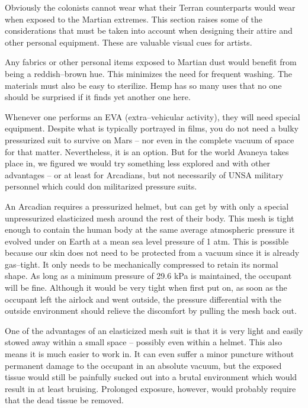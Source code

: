 

Obviously the colonists cannot wear what their Terran counterparts would wear when exposed to the Martian extremes. This section raises some of the considerations that must be taken into account when designing their attire and other personal equipment. These are valuable visual cues for artists.

Any fabrics or other personal items exposed to Martian dust would benefit from being a reddish--brown hue. This minimizes the need for frequent washing. The materials must also be easy to sterilize. Hemp has so many uses that no one should be surprised if it finds yet another one here.

Whenever one performs an EVA (extra--vehicular activity), they will need special equipment. Despite what is typically portrayed in films, you do not need a bulky pressurized suit to survive on Mars -- nor even in the complete vacuum of space for that matter. Nevertheless, it is an option. But for the world Avaneya takes place in, we figured we would try something less explored and with other advantages -- or at least for Arcadians, but not necessarily of UNSA military personnel which could don militarized pressure suits.

An Arcadian requires a pressurized helmet, but can get by with only a special unpressurized elasticized mesh around the rest of their body. This mesh is tight enough to contain the human body at the same average atmospheric pressure it evolved under on Earth at a mean sea level pressure of 1 atm. This is possible because our skin does not need to be protected from a vacuum since it is already gas--tight. It only needs to be mechanically compressed to retain its normal shape. As long as a minimum pressure of 29.6 kPa is maintained, the occupant will be fine. Although it would be very tight when first put on, as soon as the occupant left the airlock and went outside, the pressure differential with the outside environment should relieve the discomfort by pulling the mesh back out.

One of the advantages of an elasticized mesh suit is that it is very light and easily stowed away within a small space -- possibly even within a helmet. This also means it is much easier to work in. It can even suffer a minor puncture without permanent damage to the occupant in an absolute vacuum, but the exposed tissue would still be painfully sucked out into a brutal environment which would result in at least bruising. Prolonged exposure, however, would probably require that the dead tissue be removed.

